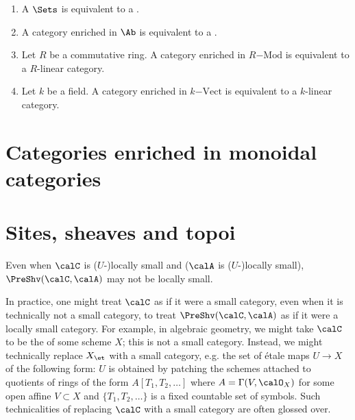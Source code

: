

\begin{example}
    \begin{enumerate}
        \item A  $\Sets$ is equivalent to a . 
        \item A category enriched in $\Ab$ is equivalent to a . 
        \item Let $R$ be a commutative ring. A category enriched in $R\mathrm{-Mod}$ is equivalent to a $R$-linear category. 
        \item Let $k$ be a field. A category enriched in $k\mathrm{-Vect}$ is equivalent to a $k$-linear category. 
    \end{enumerate}
\end{example}


\section{Categories enriched in monoidal categories}

\section{Sites, sheaves and topoi}



\begin{remark}
    Even when $\calC$ is ($U$-)locally small and ($\calA$ is ($U$-)locally small), $\PreShv(\calC, \calA)$ may not be locally small.
\end{remark}
\begin{remark}
    In practice, one might treat $\calC$ as if it were a small category, even when it is technically not a small category, to treat $\PreShv(\calC, \calA)$ as if it were a locally small category. For example, in algebraic geometry, we might take $\calC$ to be the  of some scheme $X$; this is not a small category. Instead, we might technically replace $X_{\et}$ with a small category, e.g. the set of \'etale maps $U \to X$ of the following form: $U$ is obtained by patching the schemes attached to quotients of rings of the form $A[T_1,T_2,\ldots]$ where $A = \Gamma(V, \calO_X)$ for some open affine $V \subset X$ and $\{T_1,T_2,\ldots\}$ is a fixed countable set of symbols. Such technicalities of replacing $\calC$ with a small category are often glossed over.
\end{remark}

